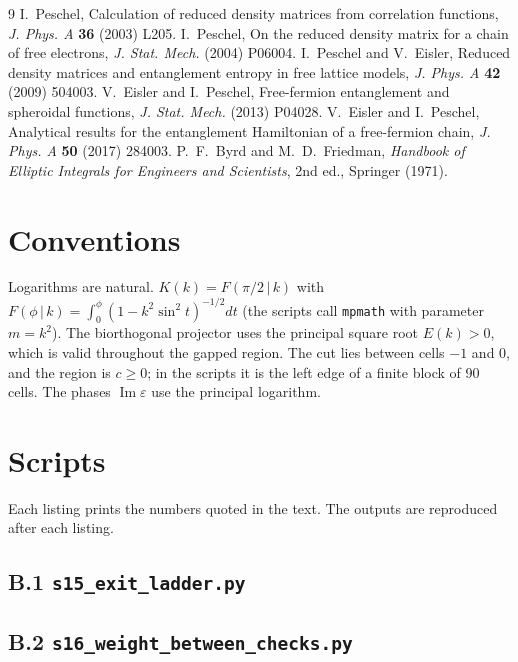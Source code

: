 \documentclass[11pt]{article}
\theoremstyle{definition}
\newcommand{\Ima}{\operatorname{Im}}
\begin{document}
\begin{thebibliography}{9}
 I.~Peschel, Calculation of reduced density matrices from correlation functions, \emph{J. Phys. A} \textbf{36} (2003) L205.
 I.~Peschel, On the reduced density matrix for a chain of free electrons, \emph{J. Stat. Mech.} (2004) P06004.
 I.~Peschel and V.~Eisler, Reduced density matrices and entanglement entropy in free lattice models, \emph{J. Phys. A} \textbf{42} (2009) 504003.
 V.~Eisler and I.~Peschel, Free-fermion entanglement and spheroidal functions, \emph{J. Stat. Mech.} (2013) P04028.
 V.~Eisler and I.~Peschel, Analytical results for the entanglement Hamiltonian of a free-fermion chain, \emph{J. Phys. A} \textbf{50} (2017) 284003.
 P.~F.~Byrd and M.~D.~Friedman, \emph{Handbook of Elliptic Integrals for Engineers and Scientists}, 2nd ed., Springer (1971).
\end{thebibliography}

\appendix
\section{Conventions}
Logarithms are natural. $K(k)=F(\pi/2\,|\,k)$ with $F(\phi\,|\,k)=\int_0^\phi(1-k^2\sin^2t)^{-1/2}dt$ (the scripts call \texttt{mpmath} with parameter $m=k^2$). The biorthogonal projector uses the principal square root $E(k)>0$, which is valid throughout the gapped region. The cut lies between cells $-1$ and $0$, and the region is $c\ge0$; in the scripts it is the left edge of a finite block of 90 cells. The phases $\Ima\varepsilon$ use the principal logarithm.

\section{Scripts}
Each listing prints the numbers quoted in the text. The outputs are reproduced after each listing.

\subsection*{B.1 \texttt{s15\_exit\_ladder.py}}


\subsection*{B.2 \texttt{s16\_weight\_between\_checks.py}}


\end{document}
